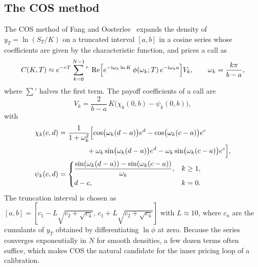 \documentclass[11pt,a4paper]{article}
\theoremstyle{plain}
\theoremstyle{definition}
\newcommand{\Real}{\operatorname{Re}}
\newcommand{\iu}{\mathrm{i}}
\begin{document}
\subsection{The COS method}
The COS method of Fang and Oosterlee~\cite{fangoosterlee} expands the density of $y_T=\ln(S_T/K)$ on a truncated interval $[a,b]$ in a cosine series whose coefficients are given by the characteristic function, and prices a call as
\begin{equation}
    C(K,T)\approx e^{-rT}\sum_{k=0}^{N-1}{}^{\prime}\ \Real\Bigl[e^{-\iu\omega_k\ln K}\,\phi(\omega_k;T)\,e^{-\iu\omega_ka}\Bigr]V_k,\qquad \omega_k=\frac{k\pi}{b-a},
\end{equation}
where $\sum'$ halves the first term. The payoff coefficients of a call are
\begin{equation}
    V_k=\frac{2}{b-a}\,K\bigl(\chi_k(0,b)-\psi_k(0,b)\bigr),
\end{equation}
with
\begin{align}
    \chi_k(c,d)&=\frac{1}{1+\omega_k^2}\Bigl[\cos\bigl(\omega_k(d-a)\bigr)e^{d}-\cos\bigl(\omega_k(c-a)\bigr)e^{c}\nonumber\\
    &\qquad\qquad+\omega_k\sin\bigl(\omega_k(d-a)\bigr)e^{d}-\omega_k\sin\bigl(\omega_k(c-a)\bigr)e^{c}\Bigr],\\
    \psi_k(c,d)&=\begin{cases}\dfrac{\sin(\omega_k(d-a))-\sin(\omega_k(c-a))}{\omega_k}, & k\ge1,\\[2mm] d-c, & k=0.\end{cases}
\end{align}
The truncation interval is chosen as $[a,b]=[c_1-L\sqrt{c_2+\sqrt{c_4}},\,c_1+L\sqrt{c_2+\sqrt{c_4}}]$ with $L\approx10$, where $c_n$ are the cumulants of $y_T$ obtained by differentiating $\ln\phi$ at zero. Because the series converges exponentially in $N$ for smooth densities, a few dozen terms often suffice, which makes COS the natural candidate for the inner pricing loop of a calibration.
\end{document}
